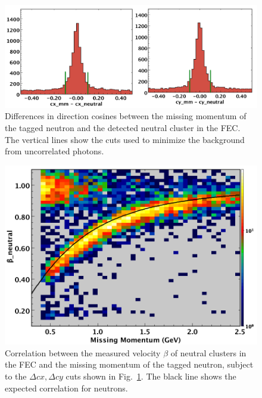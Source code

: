 \begin{figure}[h]
\centering
\includegraphics[width=1.0\columnwidth,keepaspectratio]{img/S10_4_1.png}
\caption[]{Differences in direction cosines between the missing momentum of the tagged neutron and the detected neutral cluster in the FEC.  The vertical lines show the cuts used to minimize the background from uncorrelated photons.}
\label{fig:S10_4_1}
\end{figure}

\begin{figure}[h]
\centering
\includegraphics[width=1.0\columnwidth,keepaspectratio]{img/S10_4_2.png}
\caption[]{Correlation between the measured velocity $\beta$ of neutral clusters in the FEC and the missing momentum of the tagged neutron, subject to the $\Delta cx,\Delta cy$ cuts shown in Fig.~\ref{fig:S10_4_1}.  The black line shows the expected correlation for neutrons.}
\label{fig:S10_4_2}
\end{figure}

